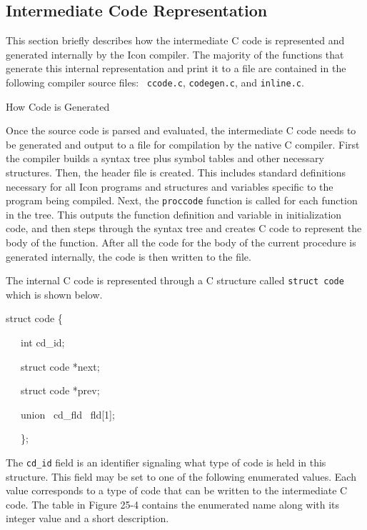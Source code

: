 \subsection{Intermediate Code Representation}

This section briefly describes how the intermediate C code is
represented and generated internally by the Icon compiler.  The
majority of the functions that generate this internal representation
and print it to a file are contained in the following compiler source
files: \ \texttt{ccode.c}, \texttt{codegen.c}, and \texttt{inline.c}.

{\sffamily
How Code is Generated}

Once the source code is parsed and evaluated, the intermediate C code
needs to be generated and output to a file for compilation by the
native C compiler. First the compiler builds a syntax tree plus symbol
tables and other necessary structures. Then, the header file is
created. This includes standard definitions necessary for all Icon
programs and structures and variables specific to the program being
compiled. Next, the \texttt{proccode} function is called for each
function in the tree. This outputs the function definition and
variable in initialization code, and then steps through the syntax
tree and creates C code to represent the body of the function. After
all the code for the body of the current procedure is generated
internally, the code is then written to the file.

The internal C code is represented through a C structure called
\texttt{struct code} which is shown below.

{\ttfamily\mdseries
struct code \{}

{\ttfamily\mdseries
\ \ \ int cd\_id;}

{\ttfamily\mdseries
\ \ \ struct code *next;}

{\ttfamily\mdseries
\ \ \ struct code *prev;}

{\ttfamily\mdseries
\ \ \ union \ cd\_fld \ fld[1];}

{\ttfamily\mdseries
\ \ \ \};}


The \texttt{cd\_id} field is an identifier signaling what type of code
is held in this structure. This field may be set to one of the
following enumerated values. Each value corresponds to a type of code
that can be written to the intermediate C code. The table in Figure
25-4 contains the enumerated name along with its integer value and a
short description.

